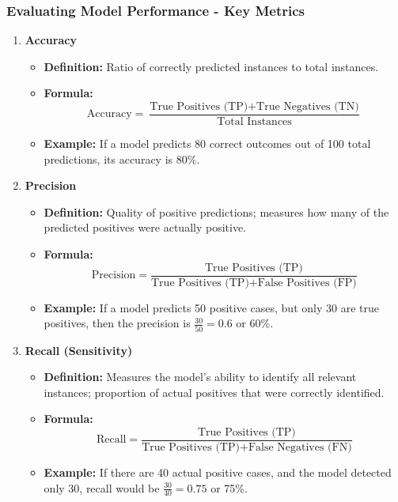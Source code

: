\documentclass[aspectratio=169]{beamer}
\begin{document}
\begin{frame}[fragile]
    \frametitle{Evaluating Model Performance - Key Metrics}
    \begin{enumerate}
        \item \textbf{Accuracy}
            \begin{itemize}
                \item \textbf{Definition:} Ratio of correctly predicted instances to total instances.
                \item \textbf{Formula:}
                \begin{equation}
                    \text{Accuracy} = \frac{\text{True Positives (TP)} + \text{True Negatives (TN)}}{\text{Total Instances}}
                \end{equation}
                \item \textbf{Example:} If a model predicts 80 correct outcomes out of 100 total predictions, its accuracy is 80\%.
            \end{itemize}

        \item \textbf{Precision}
            \begin{itemize}
                \item \textbf{Definition:} Quality of positive predictions; measures how many of the predicted positives were actually positive.
                \item \textbf{Formula:}
                \begin{equation}
                    \text{Precision} = \frac{\text{True Positives (TP)}}{\text{True Positives (TP)} + \text{False Positives (FP)}}
                \end{equation}
                \item \textbf{Example:} If a model predicts 50 positive cases, but only 30 are true positives, then the precision is \( \frac{30}{50} = 0.6 \) or 60\%.
            \end{itemize}

        \item \textbf{Recall (Sensitivity)}
            \begin{itemize}
                \item \textbf{Definition:} Measures the model's ability to identify all relevant instances; proportion of actual positives that were correctly identified.
                \item \textbf{Formula:}
                \begin{equation}
                    \text{Recall} = \frac{\text{True Positives (TP)}}{\text{True Positives (TP)} + \text{False Negatives (FN)}}
                \end{equation}
                \item \textbf{Example:} If there are 40 actual positive cases, and the model detected only 30, recall would be \( \frac{30}{40} = 0.75 \) or 75\%.
            \end{itemize}
    \end{enumerate}
\end{frame}
\end{document}
